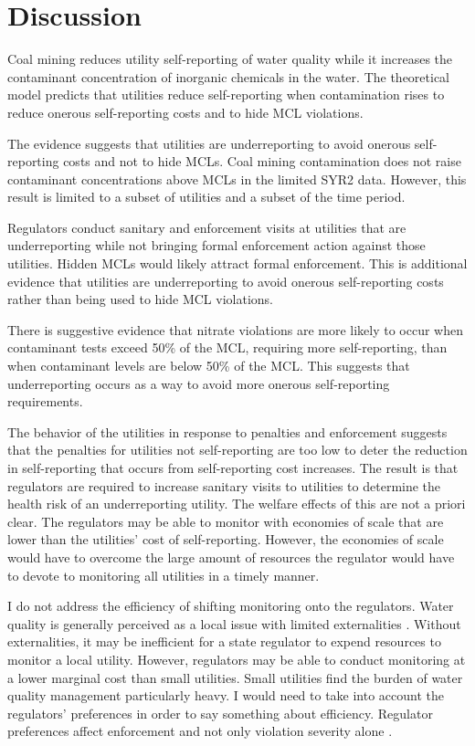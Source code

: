 \documentclass[12pt]{article}
\begin{document}




\section{Discussion}

Coal mining reduces utility self-reporting of water quality while it increases the contaminant concentration of inorganic chemicals in the water. The theoretical model predicts that utilities reduce self-reporting when contamination rises to reduce onerous self-reporting costs and to hide MCL violations. 

The evidence suggests that utilities are underreporting to avoid onerous self-reporting costs and not to hide MCLs. Coal mining contamination does not raise contaminant concentrations above MCLs in the limited SYR2 data. However, this result is limited to a subset of utilities and a subset of the time period.

Regulators conduct sanitary and enforcement visits at utilities that are underreporting while not bringing formal enforcement action against those utilities. Hidden MCLs would likely attract formal enforcement. This is additional evidence that utilities are underreporting to avoid onerous self-reporting costs rather than being used to hide MCL violations.

There is suggestive evidence that nitrate violations are more likely to occur when contaminant tests exceed 50\% of the MCL, requiring more self-reporting, than when contaminant levels are below 50\% of the MCL. This suggests that underreporting occurs as a way to avoid more onerous self-reporting requirements.

The behavior of the utilities in response to penalties and enforcement suggests that the penalties for utilities not self-reporting are too low to deter the reduction in self-reporting that occurs from self-reporting cost increases. The result is that regulators are required to increase sanitary visits to utilities to determine the health risk of an underreporting utility. The welfare effects of this are not a priori clear. The regulators may be able to monitor with economies of scale that are lower than the utilities' cost of self-reporting. However, the economies of scale would have to overcome the large amount of resources the regulator would have to devote to monitoring all utilities in a timely manner.

I do not address the efficiency of shifting monitoring onto the regulators. Water quality is generally perceived as a local issue with limited externalities \parencite{olmstead2010economics}. Without externalities, it may be inefficient for a state regulator to expend resources to monitor a local utility. However, regulators may be able to conduct monitoring at a lower marginal cost than small utilities. Small utilities find the burden of water quality management particularly heavy. I would need to take into account the regulators' preferences in order to say something about efficiency. Regulator preferences affect enforcement and not only violation severity alone \parencite{kang2021understanding}.
\end{document}
